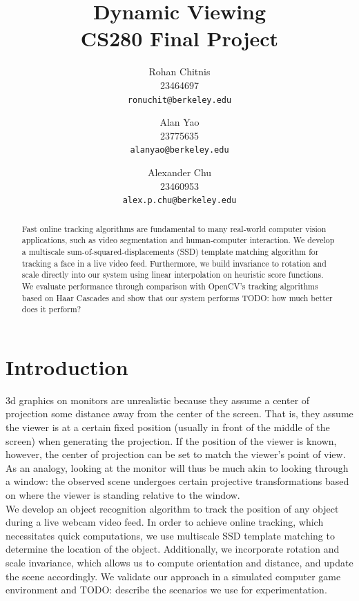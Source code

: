 \documentclass[10pt,twocolumn,letterpaper]{article}
\begin{document}
\title{Dynamic Viewing\\CS280 Final Project}

\author{Rohan Chitnis\\
23464697\\
{\tt\small ronuchit@berkeley.edu}
\and
Alan Yao\\
23775635\\
{\tt\small alanyao@berkeley.edu}
\and
Alexander Chu\\
23460953\\
{\tt\small alex.p.chu@berkeley.edu}
}

\maketitle

\begin{abstract}
  Fast online tracking algorithms are fundamental to many real-world computer
  vision applications, such as video segmentation and human-computer interaction.
  We develop a multiscale sum-of-squared-displacements (SSD) template matching algorithm for
  tracking a face in a live video feed. Furthermore, we build invariance
  to rotation and scale directly into our system using linear interpolation on heuristic
  score functions. We evaluate performance through comparison with OpenCV's tracking
  algorithms based on Haar Cascades and show that our system performs TODO: how
  much better does it perform?
\end{abstract}

\section{Introduction}
3d graphics on monitors are unrealistic because they assume a center of projection
some distance away from the center of the screen. That is, they assume the viewer
is at a certain fixed position (usually in front of the middle of the screen) when
generating the projection. If the position of the viewer is known, however, the
center of projection can be set to match the viewer's point of view. As an analogy,
looking at the monitor will thus be much akin to looking through a window: the observed
scene undergoes certain projective transformations based on where the viewer is standing
relative to the window.\\

We develop an object recognition algorithm to track the position of any object
during a live webcam video feed. In order to achieve online tracking, which necessitates
quick computations, we use multiscale SSD template matching to determine the location of
the object. Additionally, we incorporate rotation and scale invariance, which allows us to
compute orientation and distance, and update the scene accordingly. We validate our
approach in a simulated computer game environment and TODO: describe the scenarios
we use for experimentation.
\end{document}
